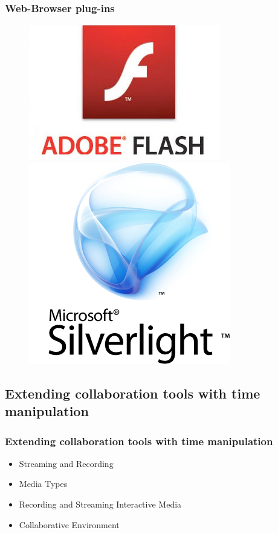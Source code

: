 \documentclass[t]{beamer}
\begin{document}
 		\begin{frame}[c]
		\frametitle{Web-Browser plug-ins}
		\begin{figure}
			\includegraphics[height=0.3\textheight]{figures/flash.jpg}
			\includegraphics[height=0.3\textheight]{figures/silverlight.png}
		\end{figure}
		\end{frame}


	\subsection{Extending collaboration tools with time manipulation}
  		\begin{frame}[c]
		\frametitle{Extending collaboration tools with time manipulation}
		\begin{itemize}
		\item Streaming and Recording
		\vfill
		\item Media Types
		\vfill
		\item Recording and Streaming Interactive Media
		\vfill
		\item Collaborative Environment
		\end{itemize}
		\end{frame}
\end{document}
